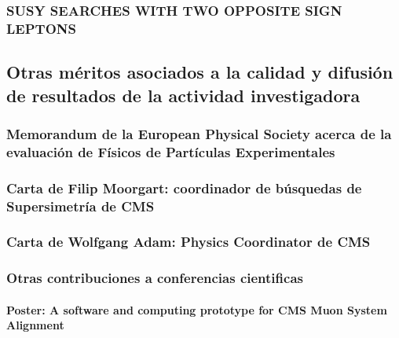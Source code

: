 \documentclass[a4paper, 11pt, twoside, openright]{report}
\begin{document}
\subsubsection{SUSY SEARCHES WITH TWO OPPOSITE SIGN LEPTONS}




\subsection{Otras méritos asociados a la calidad y difusión de resultados de la actividad investigadora}

\subsubsection{Memorandum de la European Physical Society acerca de la evaluación de Físicos de Partículas Experimentales}


\subsubsection{Carta de Filip Moorgart: coordinador de búsquedas de Supersimetría de CMS}


\subsubsection{Carta de Wolfgang Adam: Physics Coordinator de CMS}



\subsubsection{Otras contribuciones a conferencias cientificas}


\paragraph{Poster: A software and computing prototype for CMS Muon System Alignment}

\end{document}
